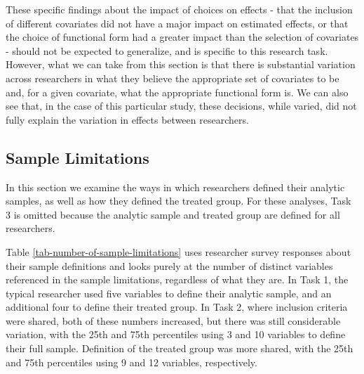 \documentclass[
  letterpaper,
  DIV=11,
  numbers=noendperiod]{scrartcl}
\begin{document}
These specific findings about the impact of choices on effects - that
the inclusion of different covariates did not have a major impact on
estimated effects, or that the choice of functional form had a greater
impact than the selection of covariates - should not be expected to
generalize, and is specific to this research task. However, what we can
take from this section is that there is substantial variation across
researchers in what they believe the appropriate set of covariates to be
and, for a given covariate, what the appropriate functional form is. We
can also see that, in the case of this particular study, these
decisions, while varied, did not fully explain the variation in effects
between researchers.

\subsection{Sample Limitations}\label{sec-sample-limitations}

In this section we examine the ways in which researchers defined their
analytic samples, as well as how they defined the treated group. For
these analyses, Task 3 is omitted because the analytic sample and
treated group are defined for all researchers.

Table \ref{tab-number-of-sample-limitations} uses researcher survey
responses about their sample definitions and looks purely at the number
of distinct variables referenced in the sample limitations, regardless
of what they are. In Task 1, the typical researcher used five variables
to define their analytic sample, and an additional four to define their
treated group. In Task 2, where inclusion criteria were shared, both of
these numbers increased, but there was still considerable variation,
with the 25th and 75th percentiles using 3 and 10 variables to define
their full sample. Definition of the treated group was more shared, with
the 25th and 75th percentiles using 9 and 12 variables, respectively.
\end{document}
